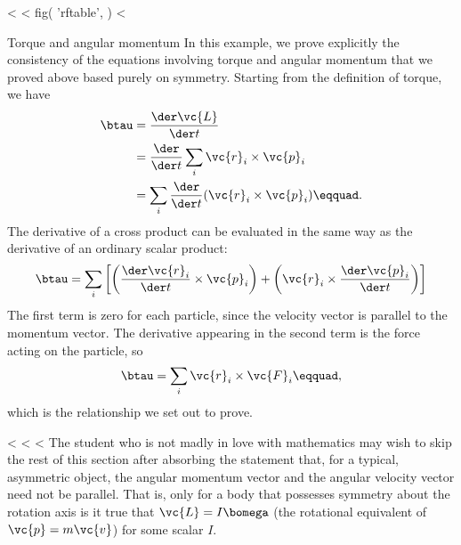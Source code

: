 <%
<%
  fig(
    'rftable',
  )
<%

\begin{eg}{Torque and angular momentum}\label{eg:torqueproof}
In this example, we prove explicitly the consistency of the
equations involving torque and angular momentum that we
proved above based purely on symmetry.
Starting from the definition of torque, we
have
\begin{align*}
        \btau                &= \frac{\der\vc{L}}{\der t} \\
                        &= \frac{\der}{\der t}\sum_{i} \vc{r}_i\times\vc{p}_i \\
                        &= \sum_{i} \frac{\der}{\der t}(\vc{r}_i\times\vc{p}_{i})\eqquad.
\end{align*}
The derivative of a cross product can be evaluated in the same way
as the derivative of an ordinary scalar product:
\begin{equation*}
                \btau = \sum_i\left[
                                \left(\frac{\der\vc{r}_{i}}{\der t}\times\vc{p}_i\right)
                                +\left(\vc{r}_i\times\frac{\der\vc{p}_{i}}{\der t}\right)
                        \right]
\end{equation*}
The first term is zero for each particle, since the velocity
vector is parallel to the momentum vector. The derivative
appearing in the second term is the force acting on
the particle, so
\begin{equation*}
        \btau                =    \sum_i \vc{r}_{i}\times\vc{F}_i\eqquad,
\end{equation*}
which is the relationship we set out to prove.
\end{eg}

<%
<%
<%
The student who is not madly in love with mathematics may
wish to skip the rest of this section after absorbing the
statement that, for a typical, asymmetric object, the angular
momentum vector and the angular velocity vector need not be
parallel. That is, only for a body that possesses 
symmetry about the rotation axis is it true that $\vc{L}=I\bomega$ (the
rotational equivalent of $\vc{p}=m\vc{v}$) for some scalar $I$.

